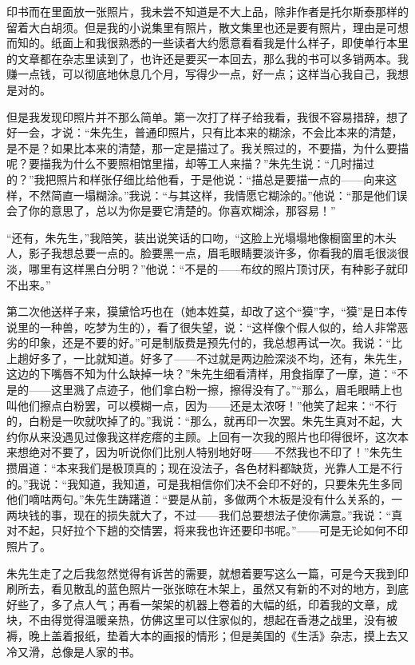 \par 印书而在里面放一张照片，我未尝不知道是不大上品，除非作者是托尔斯泰那样的留着大白胡须。但是我的小说集里有照片，散文集里也还是要有照片，理由是可想而知的。纸面上和我很熟悉的一些读者大约愿意看看我是什么样子，即使单行本里的文章都在杂志里读到了，也许还是要买一本回去，那么我的书可以多销两本。我赚一点钱，可以彻底地休息几个月，写得少一点，好一点；这样当心我自己，我想是对的。
\par 但是我发现印照片并不那么简单。第一次打了样子给我看，我很不容易措辞，想了好一会，才说：“朱先生，普通印照片，只有比本来的糊涂，不会比本来的清楚，是不是？如果比本来的清楚，那一定是描过了。我关照过的，不要描，为什么要描呢？要描我为什么不要照相馆里描，却等工人来描？”朱先生说：“几时描过的？”我把照片和样张仔细比给他看，于是他说：“描总是要描一点的——向来这样，不然简直一塌糊涂。”我说：“与其这样，我情愿它糊涂的。”他说：“那是他们误会了你的意思了，总以为你是要它清楚的。你喜欢糊涂，那容易！”
\par “还有，朱先生，”我陪笑，装出说笑话的口吻，“这脸上光塌塌地像橱窗里的木头人，影子我想总要一点的。脸要黑一点，眉毛眼睛要淡许多，你看我的眉毛很淡很淡，哪里有这样黑白分明？”他说：“不是的——布纹的照片顶讨厌，有种影子就印不出来。”
\par 第二次他送样子来，獏黛恰巧也在（她本姓莫，却改了这个“獏”字，“獏”是日本传说里的一种兽，吃梦为生的），看了很失望，说：“这样像个假人似的，给人非常恶劣的印象，还是不要的好。”可是制版费是预先付的，我总想再试一次。我说：“比上趟好多了，一比就知道。好多了——不过就是两边脸深淡不均，还有，朱先生，这边的下嘴唇不知为什么缺掉一块？”朱先生细看清样，用食指摩了一摩，道：“不是的——这里溅了点迹子，他们拿白粉一擦，擦得没有了。”“那么，眉毛眼睛上也叫他们擦点白粉罢，可以模糊一点，因为——还是太浓呀！”他笑了起来：“不行的，白粉是一吹就吹掉了的。”我说：“那么，就再印一次罢。朱先生真对不起，大约你从来没遇见过像我这样疙瘩的主顾。上回有一次我的照片也印得很坏，这次本来想绝对不要了，因为听说你们比别人特别地好呀——不然我也不印了！”朱先生攒眉道：“本来我们是极顶真的；现在没法子，各色材料都缺货，光靠人工是不行的。”我说：“我知道，我知道，可是我相信你们决不会印不好的，只要朱先生多同他们嘀咕两句。”朱先生踌躇道：“要是从前，多做两个木板是没有什么关系的，一两块钱的事，现在的损失就大了，不过——我们总要想法子使你满意。”我说：“真对不起，只好拉个下趟的交情罢，将来我也许还要印书呢。”——可是无论如何不印照片了。
\par 朱先生走了之后我忽然觉得有诉苦的需要，就想着要写这么一篇，可是今天我到印刷所去，看见散乱的蓝色照片一张张晾在木架上，虽然又有新的不对的地方，到底好些了，多了点人气；再看一架架的机器上卷着的大幅的纸，印着我的文章，成块，不由得觉得温暖亲热，仿佛这里可以住家似的，想起在香港之战里，没有被褥，晚上盖着报纸，垫着大本的画报的情形；但是美国的《生活》杂志，摸上去又冷又滑，总像是人家的书。
